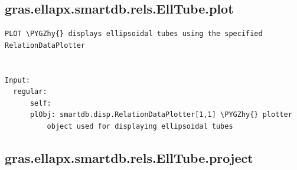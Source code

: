 \documentclass[letterpaper,10pt,english]{sphinxmanual}
\def\PYGZhy{\char`\-}
\begin{document}
\subsection{gras.ellapx.smartdb.rels.EllTube.plot}
\label{chap_functions:gras-ellapx-smartdb-rels-elltube-plot}
\begin{Verbatim}[commandchars=\\\{\}]
PLOT \PYGZhy{} displays ellipsoidal tubes using the specified RelationDataPlotter


Input:
  regular:
      self:
      plObj: smartdb.disp.RelationDataPlotter[1,1] \PYGZhy{} plotter
          object used for displaying ellipsoidal tubes
\end{Verbatim}


\subsection{gras.ellapx.smartdb.rels.EllTube.project}
\label{chap_functions:gras-ellapx-smartdb-rels-elltube-project}
\end{document}
